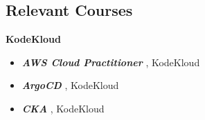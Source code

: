 \documentclass[../main.tex]{subfiles}
\begin{document}
\begin{category}
\section{Relevant Courses}
    \citembullet \textbf{KodeKloud}
    \begin{itemize}  
        \item \textbf{\emph{AWS Cloud Practitioner}} , KodeKloud
        \item \textbf{\emph{ArgoCD}} , KodeKloud
        \item \textbf{\emph{CKA}} , KodeKloud
       
    \\[-5pt]
    \end{itemize}
\end{category}
\end{document}
